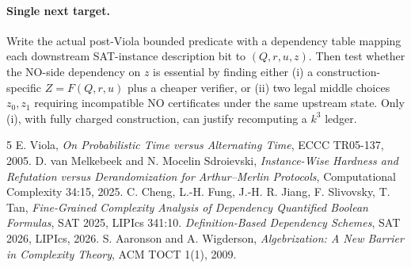 \documentclass[11pt]{article}
\begin{document}
\paragraph{Single next target.} Write the actual post-Viola bounded predicate with a dependency table mapping each downstream SAT-instance description bit to $(Q,r,u,z)$. Then test whether the NO-side dependency on $z$ is essential by finding either (i) a construction-specific $Z=F(Q,r,u)$ plus a cheaper verifier, or (ii) two legal middle choices $z_0,z_1$ requiring incompatible NO certificates under the same upstream state. Only (i), with fully charged construction, can justify recomputing a $k^3$ ledger.
\begin{thebibliography}{5}
 E. Viola, \emph{On Probabilistic Time versus Alternating Time}, ECCC TR05-137, 2005.
 D. van Melkebeek and N. Mocelin Sdroievski, \emph{Instance-Wise Hardness and Refutation versus Derandomization for Arthur--Merlin Protocols}, Computational Complexity 34:15, 2025.
 C. Cheng, L.-H. Fung, J.-H. R. Jiang, F. Slivovsky, T. Tan, \emph{Fine-Grained Complexity Analysis of Dependency Quantified Boolean Formulas}, SAT 2025, LIPIcs 341:10.
 \emph{Definition-Based Dependency Schemes}, SAT 2026, LIPIcs, 2026.
 S. Aaronson and A. Wigderson, \emph{Algebrization: A New Barrier in Complexity Theory}, ACM TOCT 1(1), 2009.
\end{thebibliography}
\end{document}
